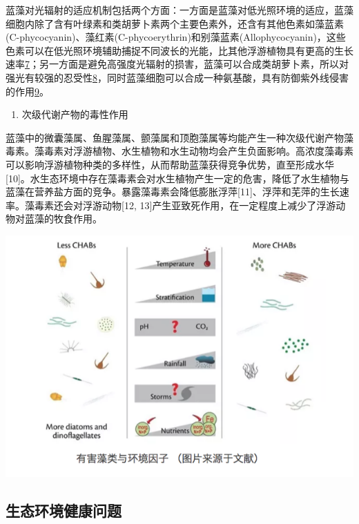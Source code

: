 \documentclass[]{book}
\providecommand{\tightlist}{%
  \setlength{\itemsep}{0pt}\setlength{\parskip}{0pt}}
\begin{document}
蓝藻对光辐射的适应机制包括两个方面：一方面是蓝藻对低光照环境的适应，蓝藻细胞内除了含有叶绿素和类胡萝卜素两个主要色素外，还含有其他色素如藻蓝素(C-phycocyanin)、藻红素(C-phycoerythrin)和别藻蓝素(Allophycocyanin)，这些色素可以在低光照环境辅助捕捉不同波长的光能，比其他浮游植物具有更高的生长速率\href{Liu\%20R\%20L,\%20Liu\%20Y,\%20et\%20al.\%20Bioresourse\%20Technology\%202014,\%20154:\%20138.}{7}；另一方面是避免高强度光辐射的损害，蓝藻可以合成类胡萝卜素，所以对强光有较强的忍受性\href{Gao\%20F,Qu\%20J\%20Y,\%20et\%20al.\%20Electrochim.\%20Acta\%202016,\%20190:\%201134.}{8}，同时蓝藻细胞可以合成一种氨基酸，具有防御紫外线侵害的作用\href{Jiang\%20J,\%20Zhu\%20J\%20H,\%20et\%20al.\%20Energy\%20Environ.\%20Sci.\%202014,\%207:\%202670.}{9}。

\begin{enumerate}
\def\labelenumi{\arabic{enumi}.}
\setcounter{enumi}{4}
\tightlist
\item
  次级代谢产物的毒性作用
\end{enumerate}

蓝藻中的微囊藻属、鱼腥藻属、颤藻属和顶胞藻属等均能产生一种次级代谢产物藻毒素。藻毒素对浮游植物、水生植物和水生动物均会产生负面影响。高浓度藻毒素可以影响浮游植物种类的多样性，从而帮助蓝藻获得竞争优势，直至形成水华{[}10{]}。水生态环境中存在藻毒素会对水生植物产生一定的危害，降低了水生植物与蓝藻在营养盐方面的竞争。暴露藻毒素会降低膨胀浮萍{[}11{]}、浮萍和芜萍的生长速率。藻毒素还会对浮游动物{[}12,
13{]}产生亚致死作用，在一定程度上减少了浮游动物对蓝藻的牧食作用。

\includegraphics[width=8.33in]{images/lanzao2}

\subsection{生态环境健康问题}
\end{document}
